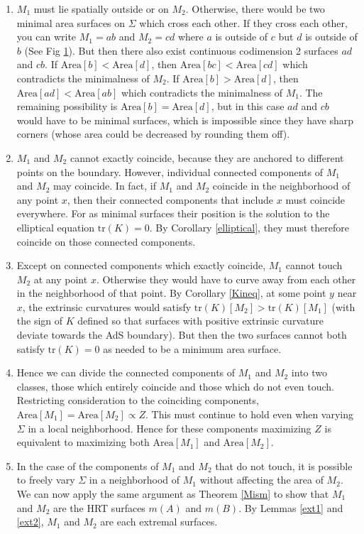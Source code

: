 \documentclass{article}
\begin{document}
\begin{enumerate}[resume]
\begin{enumerate}
\begin{figure}[hbt]
{}\label{cross}
\end{figure}
	\item \label{crossing} $M_1$ must lie spatially outside or on $M_2$.  Otherwise, there would be two minimal area surfaces on $\Sigma$ which cross each other.  If they cross each other, you can write $M_1 = ab$ and $M_2 = cd$ where $a$ is outside of $c$ but $d$ is outside of $b$ (See Fig \ref{cross}).  But then there also exist continuous codimension 2 surfaces $ad$ and $cb$.  If $\mathrm{Area}[b] < \mathrm{Area}[d]$, then $\mathrm{Area}[bc] < \mathrm{Area}[cd]$ which contradicts the minimalness of $M_2$.  If $\mathrm{Area}[b] > \mathrm{Area}[d]$, then $\mathrm{Area}[ad] < \mathrm{Area}[ab]$ which contradicts the minimalness of $M_1$.  The remaining possibility is $\mathrm{Area}[b] = \mathrm{Area}[d]$, but in this case $ad$ and $cb$ would have to be minimal surfaces, which is impossible since they have sharp corners (whose area could be decreased by rounding them off).
	\item $M_1$ and $M_2$ cannot exactly coincide, because they are anchored to different points on the boundary.  However, individual connected components of $M_1$ and $M_2$ may coincide.  In fact, if $M_1$ and $M_2$ coincide in the neighborhood of any point $x$, then their connected components that include $x$ must coincide everywhere.  For as minimal surfaces their position is the solution to the elliptical equation $\mathrm{tr}(K) = 0$.  By Corollary \ref{elliptical}, they must therefore coincide on those connected components. 
	\item Except on connected components which exactly coincide, $M_1$ cannot touch $M_2$ at any point $x$.  Otherwise they would have to curve away from each other in the neighborhood of that point.  By Corollary \ref{Kineq}, at some point $y$ near $x$, the extrinsic curvatures would satisfy 
$\mathrm{tr}(K)[M_2] > \mathrm{tr}(K)[M_1]$ (with the sign of $K$ defined so that surfaces with positive extrinsic curvature deviate towards the AdS boundary).  But then the two surfaces cannot both satisfy $\mathrm{tr}(K) = 0$ as needed to be a minimum area surface.
	\item Hence we can divide the connected components of $M_1$ and $M_2$ into two classes, those which entirely coincide and those which do not even touch.  Restricting consideration to the coinciding components, $\mathrm{Area}[M_1] = \mathrm{Area}[M_2] \propto Z$.  This must continue to hold even when varying $\Sigma$ in a local neighborhood.  Hence for these components maximizing $Z$ is equivalent to maximizing both $\mathrm{Area}[M_1]$ and $\mathrm{Area}[M_2]$.
	\item In the case of the components of $M_1$ and $M_2$ that do not touch, it is possible to freely vary $\Sigma$ in a neighborhood of $M_1$ without affecting the area of $M_2$.  We can now apply the same argument as Theorem \ref{Mism} to show that $M_1$ and $M_2$ are the HRT surfaces $m(A)$ and $m(B)$.  By Lemmas \ref{ext1} and \ref{ext2}, $M_1$ and $M_2$ are each extremal surfaces.


\end{enumerate}
\end{enumerate}
\end{document}
